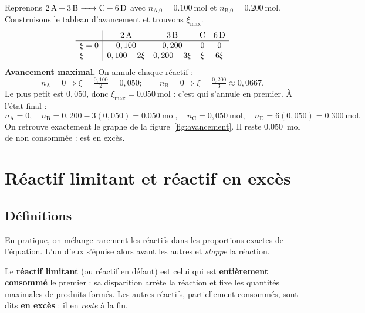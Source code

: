 \documentclass[11pt,a4paper]{article}
\newcommand{\nq}[1]{n_{\text{#1}}}        %
\begin{document}
\begin{exemple}
Reprenons $\ce{2A + 3B -> C + 6D}$ avec $\nq{A,0}=\SI{0,100}{\mole}$ et $\nq{B,0}=\SI{0,200}{\mole}$.
Construisons le tableau d'avancement et trouvons $\xi_{\max}$.
\renewcommand{\arraystretch}{1.35}
\[
\begin{array}{l|cccc}
 & 2\,\ce{A} & 3\,\ce{B} & \ce{C} & 6\,\ce{D}\\
\hline
\xi=0 & 0,100 & 0,200 & 0 & 0\\
\xi   & 0,100-2\xi & 0,200-3\xi & \xi & 6\xi\\
\end{array}
\]
\textbf{Avancement maximal.} On annule chaque réactif :
\[
\nq{A}=0 \Rightarrow \xi=\tfrac{0,100}{2}=0,050 ;\qquad
\nq{B}=0 \Rightarrow \xi=\tfrac{0,200}{3}\approx0,0667 .
\]
Le plus petit est $0,050$, donc $\xi_{\max}=\SI{0,050}{\mole}$ : c'est  qui s'annule en
premier. À l'état final :
\[
\nq{A}=0,\quad \nq{B}=0,200-3(0,050)=\SI{0,050}{\mole},\quad
\nq{C}=0,050\ \text{mol},\quad \nq{D}=6(0,050)=\SI{0,300}{\mole}.
\]
On retrouve exactement le graphe de la figure~\ref{fig:avancement}. Il reste \SI{0,050}{\mole} de
 non consommée :  est en excès.
\end{exemple}

\section{Réactif limitant et réactif en excès}
\label{sec:limitant}
\subsection{Définitions}

En pratique, on mélange rarement les réactifs dans les proportions exactes de l'équation. L'un
d'eux s'épuise alors avant les autres et \emph{stoppe} la réaction.

\begin{definition}
Le \textbf{réactif limitant} (ou réactif en défaut) est celui qui est \textbf{entièrement
consommé} le premier : sa disparition arrête la réaction et fixe les quantités maximales de
produits formés. Les autres réactifs, partiellement consommés, sont dits \textbf{en excès} : il en
\emph{reste} à la fin.
\end{definition}
\end{document}
